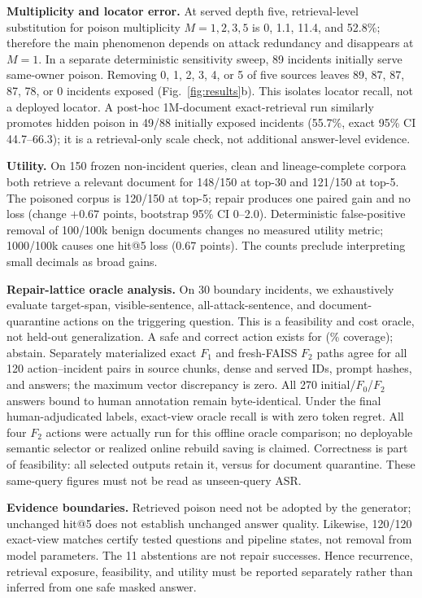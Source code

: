\documentclass{article}
\newcommand{\fzero}{\ensuremath{F_0}}
\newcommand{\fone}{\ensuremath{F_1}}
\newcommand{\ftwo}{\ensuremath{F_2}}
\begin{document}
\textbf{Multiplicity and locator error.} At served depth five, retrieval-level
substitution for poison multiplicity $M=1,2,3,5$ is 0, 1.1, 11.4, and 52.8\%;
therefore the main phenomenon depends on attack redundancy and disappears at
$M=1$. In a separate deterministic sensitivity sweep, 89 incidents initially
serve same-owner poison. Removing 0, 1, 2, 3, 4, or 5 of five sources leaves
89, 87, 87, 87, 78, or 0 incidents exposed (Fig.~\ref{fig:results}b). This
isolates locator recall, not a deployed locator.
A post-hoc 1M-document exact-retrieval run similarly promotes hidden poison in
49/88 initially exposed incidents (55.7\%, exact 95\% CI 44.7--66.3); it is a
retrieval-only scale check, not additional answer-level evidence.

\textbf{Utility.} On 150 frozen non-incident queries, clean and
lineage-complete corpora both retrieve a relevant document for 148/150 at
top-30 and 121/150 at top-5. The poisoned corpus is 120/150 at top-5; repair
produces one paired gain and no loss (change $+0.67$ points, bootstrap 95\% CI
0--2.0). Deterministic false-positive removal of 100/100k benign documents
changes no measured utility metric; 1000/100k causes one hit@5 loss (0.67
points). The counts preclude interpreting small decimals as broad gains.

\textbf{Repair-lattice oracle analysis.} On 30 boundary incidents, we
exhaustively evaluate target-span, visible-sentence, all-attack-sentence, and
document-quarantine actions on the triggering question. This is a feasibility
and cost oracle, not held-out generalization. A safe and correct action exists
for \RepairFeasibleCount{} (\RepairCoverage\% coverage); \RepairAbstainCount{} abstain. \RepairActionSentence{}
Separately materialized exact \fone{} and fresh-FAISS \ftwo{} paths agree for all
120 action--incident pairs in source chunks, dense and served IDs, prompt hashes,
and answers; the maximum vector discrepancy is zero. All 270 initial/\fzero{}/\ftwo{}
answers bound to human annotation remain byte-identical. Under the final
human-adjudicated labels, exact-view oracle recall is \RepairFinalistCount{} with zero token regret.
All four \ftwo{} actions were actually run for this offline oracle comparison;
no deployable semantic selector or realized online rebuild saving is claimed.
Correctness is part of feasibility: all \RepairSelectedCorrect{} selected
outputs retain it, versus \RepairDocumentCorrect{} for document quarantine. These same-query
figures must not be read as unseen-query ASR.

\textbf{Evidence boundaries.} Retrieved poison need not be adopted by the
generator; unchanged hit@5 does not establish unchanged answer quality.
Likewise, 120/120 exact-view matches certify tested questions and pipeline
states, not removal from model parameters. The 11 abstentions are not repair
successes. Hence recurrence, retrieval exposure, feasibility, and utility must
be reported separately rather than inferred from one safe masked answer.
\end{document}
